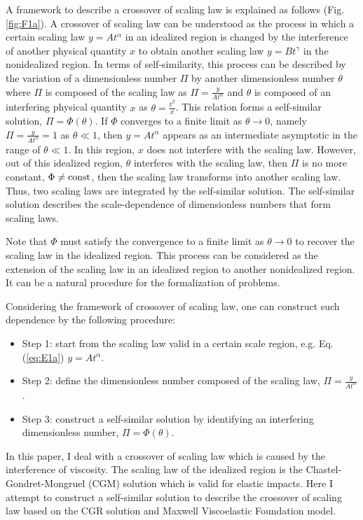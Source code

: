 \documentclass[default,iicol,10pt]{sn-jnl}%
\theoremstyle{thmstyleone}%
\theoremstyle{thmstyletwo}%
\theoremstyle{thmstylethree}%
\begin{document}
A framework to describe a crossover of scaling law is explained as follows (Fig. \ref{fig:F1a}). A crossover of scaling law can be understood as the process in which a certain scaling law $y = A t^{\alpha}$ in an idealized region is changed by the interference of another physical quantity $x$ to obtain another scaling law $y= B t^{\gamma}$ in the nonidealized region. In terms of self-similarity, this process can be described by the variation of a dimensionless number $\Pi$ by another dimensionless number $\theta$ where $\Pi$ is composed of the scaling law as $\Pi = \frac{y}{At^\alpha}$ and $\theta$ is composed of an interfering physical quantity $x$ as $\theta = \frac{t^{\beta}}{x}$. This relation forms a self-similar solution, $\Pi = \Phi \left( \theta \right)$. If $\Phi$ converges to a finite limit as $\theta \to 0$, namely $\Pi =  \frac{y}{At^\alpha}= 1$ as $\theta \ll 1$, then $y = A t^{\alpha}$ appears as an intermediate asymptotic in the range of $\theta \ll 1$. In this region, $x$ does not interfere with the scaling law. However, out of this idealized region, $\theta$ interferes with the scaling law, then $\Pi$ is no more constant, $\Phi \neq {\rm const}$, then the scaling law transforms into another scaling law. Thus, two scaling laws are integrated by the self-similar solution. The self-similar solution describes the scale-dependence of dimensionless numbers that form scaling laws.

Note that $\Phi$ must satisfy the convergence to a finite limit as $\theta \rightarrow 0$ to recover the scaling law in the idealized region. This process can be considered as the extension of the scaling law in an idealized region to another nonidealized region. It can be a natural procedure for the formalization of problems.

Considering the framework of crossover of scaling law, one can construct such dependence by the following procedure:
\begin{itemize}
      \item Step 1: start from the scaling law valid in a certain scale region, e.g. Eq. (\ref{eq:E1a}) $y = A t^{\alpha}$.
      \item Step 2: define the dimensionless number composed of the scaling law, $\Pi = \frac{y}{At^{\alpha}}$.
      \item Step 3: construct a self-similar solution by identifying an interfering dimensionless number, $\Pi = \Phi \left( \theta \right)$.
\end{itemize}

In this paper, I deal with a crossover of scaling law which is caused by the interference of viscosity. The scaling law of the idealized region is the Chastel-Gondret-Mongruel (CGM) solution which is valid for elastic impacts. Here I attempt to construct a self-similar solution to describe the crossover of scaling law based on the CGR solution and Maxwell Viscoelastic Foundation model.
\end{document}
